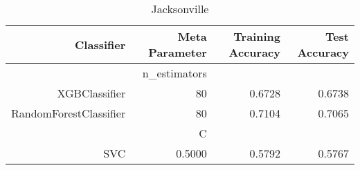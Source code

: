 
\begin{table}[H]
    \caption{Jacksonville}
    \centering
    \begin{tabular}{|r|r|r|r|}
        \hline
        Classifier &Meta Parameter &Training Accuracy
        &Test Accuracy\\
        \hline
        &n\_estimators &\multicolumn{2}{|r|}{}\\
        \hline
        XGBClassifier &80 &0.6728 &0.6738\\
        \hline
        RandomForestClassifier &80 &0.7104 &0.7065\\
        \hline
        &C &\multicolumn{2}{|r|}{}\\
        \hline
        SVC &0.5000 &0.5792 &0.5767\\
        \hline
    \end{tabular}
\end{table}
